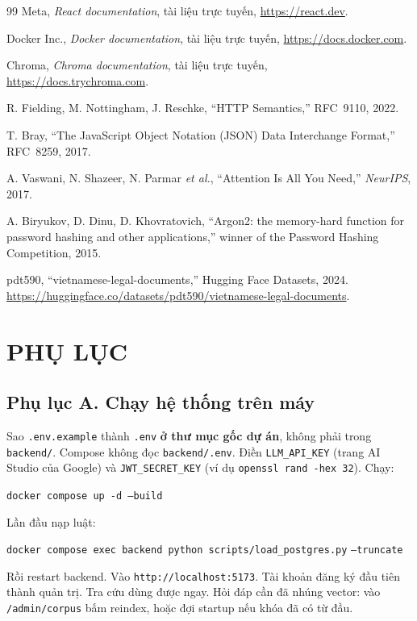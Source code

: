 \begin{thebibliography}{99}
Meta, \textit{React documentation}, tài liệu trực tuyến,
\url{https://react.dev}.

Docker Inc., \textit{Docker documentation}, tài liệu trực tuyến,
\url{https://docs.docker.com}.

Chroma, \textit{Chroma documentation}, tài liệu trực tuyến,
\url{https://docs.trychroma.com}.

R. Fielding, M. Nottingham, J. Reschke, ``HTTP Semantics,'' RFC~9110, 2022.

T. Bray, ``The JavaScript Object Notation (JSON) Data Interchange Format,''
RFC~8259, 2017.

A. Vaswani, N. Shazeer, N. Parmar \textit{et al.}, ``Attention Is All You Need,''
\textit{NeurIPS}, 2017.

A. Biryukov, D. Dinu, D. Khovratovich, ``Argon2: the memory-hard function for
password hashing and other applications,'' winner of the Password Hashing
Competition, 2015.

pdt590, ``vietnamese-legal-documents,'' Hugging Face Datasets, 2024.
\url{https://huggingface.co/datasets/pdt590/vietnamese-legal-documents}.

\end{thebibliography}

\clearpage
{}
{}
\chapter*{PHỤ LỤC}

\section*{Phụ lục A. Chạy hệ thống trên máy}

Sao \texttt{.env.example} thành \texttt{.env} \textbf{ở thư mục gốc dự án},
không phải trong \texttt{backend/}. Compose không đọc \texttt{backend/.env}.
Điền \texttt{LLM\_API\_KEY} (trang AI Studio của Google) và
\texttt{JWT\_SECRET\_KEY} (ví dụ \texttt{openssl rand -hex 32}). Chạy:

\texttt{docker compose up -d --build}

Lần đầu nạp luật:

\texttt{docker compose exec backend python scripts/load\_postgres.py}
\texttt{--truncate}

Rồi restart backend. Vào \texttt{http://localhost:5173}. Tài khoản đăng ký đầu
tiên thành quản trị. Tra cứu dùng được ngay. Hỏi đáp cần đã nhúng vector: vào
\texttt{/admin/corpus} bấm reindex, hoặc đợi startup nếu khóa đã có từ đầu.


